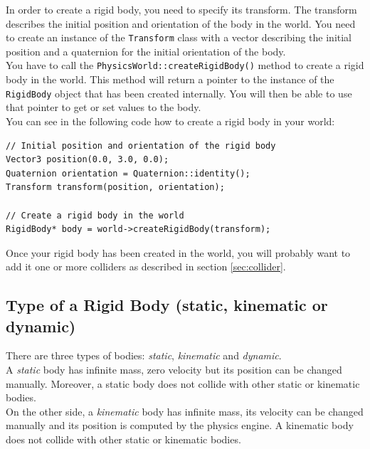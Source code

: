 \documentclass[a4paper,12pt]{article}
\begin{document}
    In order to create a rigid body, you need to specify its transform. The transform describes the initial
    position and orientation of the body in the world. You need to create an instance of the \texttt{Transform} class with a vector describing the
    initial position and a quaternion for the initial orientation of the body. \\

    You have to call the \texttt{PhysicsWorld::createRigidBody()} method to create a rigid body in the world. This method will return a pointer to the
    instance of the \texttt{RigidBody} object that has been created internally. You will then be able to use that pointer to get or set values to the body. \\

    You can see in the following code how to create a rigid body in your world: \\

    \begin{lstlisting}
// Initial position and orientation of the rigid body
Vector3 position(0.0, 3.0, 0.0);
Quaternion orientation = Quaternion::identity();
Transform transform(position, orientation);

// Create a rigid body in the world
RigidBody* body = world->createRigidBody(transform);
    \end{lstlisting}

    \vspace{0.6cm}

    Once your rigid body has been created in the world, you will probably want to add it one or more colliders as described in section \ref{sec:collider}.

    \subsection{Type of a Rigid Body (static, kinematic or dynamic)}

    There are three types of bodies: \emph{static}, \emph{kinematic} and \emph{dynamic}. \\
    
    A \emph{static} body has infinite mass, zero velocity but
    its position can be changed manually. Moreover, a static body does not collide with other static or kinematic bodies. \\
    
    On the other side, a \emph{kinematic} body has infinite mass, its velocity can be changed manually and its position is computed by the physics engine.
    A kinematic body does not collide with other static or kinematic bodies. \\
    
\end{document}
